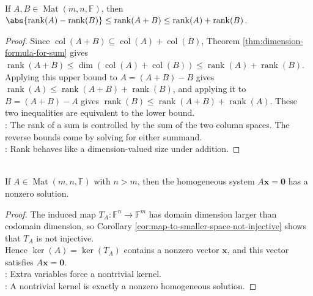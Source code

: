 \begin{theorem} \label{thm:rank-triangle-inequality} \\
If $A,B\in\operatorname{Mat}(m,n,\mathbb{F})$, then $\abs{\operatorname{rank}(A)-\operatorname{rank}(B)} \leq \operatorname{rank}(A+B) \leq \operatorname{rank}(A)+\operatorname{rank}(B)$.
\begin{proof}
Since $\operatorname{col}(A+B)\subseteq\operatorname{col}(A)+\operatorname{col}(B)$, Theorem \ref{thm:dimension-formula-for-sum} gives $\operatorname{rank}(A+B)\leq\dim(\operatorname{col}(A)+\operatorname{col}(B))\leq\operatorname{rank}(A)+\operatorname{rank}(B)$.
Applying this upper bound to $A=(A+B)-B$ gives $\operatorname{rank}(A)\leq\operatorname{rank}(A+B)+\operatorname{rank}(B)$, and applying it to $B=(A+B)-A$ gives $\operatorname{rank}(B)\leq\operatorname{rank}(A+B)+\operatorname{rank}(A)$. These two inequalities are equivalent to the lower bound.\\
: The rank of a sum is controlled by the sum of the two column spaces. The reverse bounds come by solving for either summand.\\
: Rank behaves like a dimension-valued size under addition.
\end{proof}
\end{theorem}

\begin{corollary} \label{cor:homogeneous-system-more-variables-than-equations} \\
If $A\in\operatorname{Mat}(m,n,\mathbb{F})$ with $n>m$, then the homogeneous system $A\mathbf{x}=\mathbf{0}$ has a nonzero solution.
\begin{proof}
The induced map $T_A:\mathbb{F}^n\to\mathbb{F}^m$ has domain dimension larger than codomain dimension, so Corollary \ref{cor:map-to-smaller-space-not-injective} shows that $T_A$ is not injective.\\
Hence $\ker(A)=\ker(T_A)$ contains a nonzero vector $\mathbf{x}$, and this vector satisfies $A\mathbf{x}=\mathbf{0}$.\\
: Extra variables force a nontrivial kernel.\\
: A nontrivial kernel is exactly a nonzero homogeneous solution.
\end{proof}
\end{corollary}

